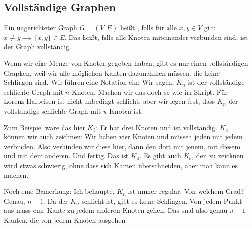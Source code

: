 \subsection{Vollständige Graphen}

\begin{spoken-clean}[00:52:42 - 00:56:27]
Ein ungerichteter Graph $G = (V, E)$ heißt , falls für alle $x, y \in V$ gilt: $x \neq y \implies \{x, y\} \in E$. Das heißt, falls alle Knoten miteinander verbunden sind, ist der Graph vollständig.

Wenn wir eine Menge von Knoten gegeben haben, gibt es nur einen vollständigen Graphen, weil wir alle möglichen Kanten dazunehmen müssen, die keine Schlingen sind. Wir führen eine Notation ein: Wir sagen, $K_n$ ist der vollständige schlichte Graph mit $n$ Knoten. Machen wir das doch so wie im Skript. Für Lorenz Halbeisen ist  nicht unbedingt schlicht, aber wir legen fest, dass $K_n$ der vollständige schlichte Graph mit $n$ Knoten ist.

Zum Beispiel wäre das hier $K_3$: Er hat drei Knoten und ist vollständig. $K_4$ können wir auch zeichnen: Wir haben vier Knoten und müssen jeden mit jedem verbinden. Also verbinden wir diese hier, dann den dort mit jenem, mit diesem und mit dem anderen. Und fertig. Das ist $K_4$. Es gibt auch $K_5$, den zu zeichnen wird etwas schwierig, ohne dass sich Kanten überschneiden, aber man kann es machen.

Noch eine Bemerkung: Ich behaupte, $K_n$ ist immer regulär. Von welchem Grad? Genau, $n-1$. Da der $K_n$ schlicht ist, gibt es keine Schlingen. Von jedem Punkt aus muss eine Kante zu jedem anderen Knoten gehen. Das sind also genau $n-1$ Kanten, die von jedem Knoten ausgehen.
\end{spoken-clean}

